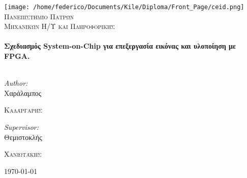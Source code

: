\begin{titlepage}

\begin{center}


\texttt{[image: /home/federico/Documents/Kile/Diploma/Front\_Page/ceid.png]}\\[1cm]    
\textsc{\LARGE Πανεπιστημίο Πατρών}\\[1.5cm]

\textsc{\Large Μηχανικών Η/Υ και Πληροφορικής}\\[2.5cm]


\HRule \\[0.4cm]
{ \Large \bfseries Σχεδιασμός System-on-Chip για επεξεργασία εικόνας και υλοποίηση με FPGA. }\\[0.4cm]

\HRule \\[5.5cm]

\begin{minipage}{0.4\textwidth}
\begin{flushleft} \large
\emph{Author:}\\
Χαράλαμπος 

\textsc{Καλάργαρης}
\end{flushleft}
\end{minipage}
\begin{minipage}{0.4\textwidth}
\begin{flushright} \large
\emph{Supervisor:} \\
Θεμιστοκλής 

\textsc{Χανιωτάκης}
\end{flushright}
\end{minipage}

\vfill

{\large \today}

\end{center}

\end{titlepage}